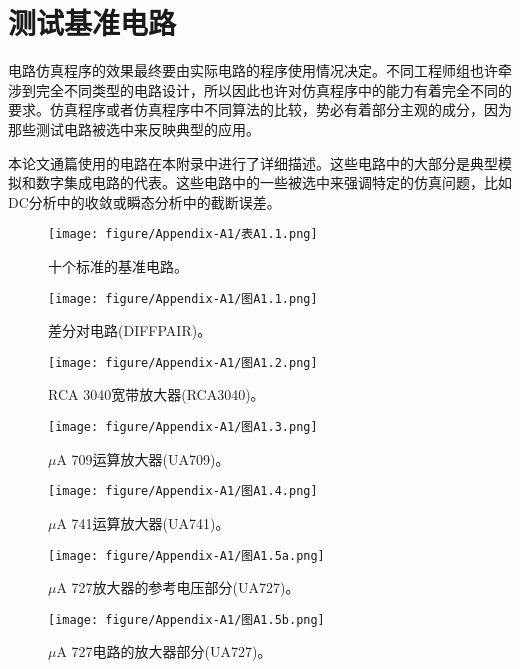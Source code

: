 \chapter{测试基准电路}
\label{App:1}
电路仿真程序的效果最终要由实际电路的程序使用情况决定。不同工程师组也许牵涉到完全不同类型的电路设计，所以因此也许对仿真程序中的能力有着完全不同的要求。仿真程序或者仿真程序中不同算法的比较，势必有着部分主观的成分，因为那些测试电路被选中来反映典型的应用。

本论文通篇使用的电路在本附录中进行了详细描述。这些电路中的大部分是典型模拟和数字集成电路的代表。这些电路中的一些被选中来强调特定的仿真问题，比如DC分析中的收敛或瞬态分析中的截断误差。

\begin{figure}[htbp]
\small
    \centering
    \texttt{[image: figure/Appendix-A1/表A1.1.png]}
    \caption{十个标准的基准电路。}
    \label{表A1.1}
\end{figure}

\begin{figure}[htbp]
\small
    \centering
    \texttt{[image: figure/Appendix-A1/图A1.1.png]}
    \caption{差分对电路(DIFFPAIR)。}
    \label{图A1.1}
\end{figure}

\begin{figure}[htbp]
\small
    \centering
    \texttt{[image: figure/Appendix-A1/图A1.2.png]}
    \caption{RCA 3040宽带放大器(RCA3040)。}
    \label{图A1.2}
\end{figure}

\begin{figure}[htbp]
\small
    \centering
    \texttt{[image: figure/Appendix-A1/图A1.3.png]}
    \caption{$\mu$A 709运算放大器(UA709)。}
    \label{图A1.3}
\end{figure}

\begin{figure}[htbp]
\small
    \centering
    \texttt{[image: figure/Appendix-A1/图A1.4.png]}
    \caption{$\mu$A 741运算放大器(UA741)。}
    \label{图A1.4}
\end{figure}

\begin{figure}[htbp]
\small
    \centering
    \texttt{[image: figure/Appendix-A1/图A1.5a.png]}
    \caption{$\mu$A 727放大器的参考电压部分(UA727)。}
    \label{图A1.5a}
\end{figure}

\begin{figure}[htbp]
\small
    \centering
    \texttt{[image: figure/Appendix-A1/图A1.5b.png]}
    \caption{$\mu$A 727电路的放大器部分(UA727)。}
    \label{图A1.5b}
\end{figure}

